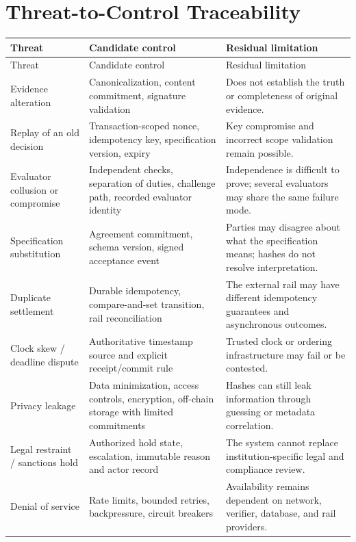 \documentclass[12pt,a4paper,oneside]{report}
\begin{document}
\section{Threat-to-Control Traceability}
\begin{longtable}{>{\raggedright\arraybackslash}p{}>{\raggedright\arraybackslash}p{}>{\raggedright\arraybackslash}p{}}
\toprule
Threat & Candidate control & Residual limitation \\
\midrule
\endfirsthead
\toprule Threat & Candidate control & Residual limitation \\
\endhead
Evidence alteration & Canonicalization, content commitment, signature validation & Does not establish the truth or completeness of original evidence. \\
Replay of an old decision & Transaction-scoped nonce, idempotency key, specification version, expiry & Key compromise and incorrect scope validation remain possible. \\
Evaluator collusion or compromise & Independent checks, separation of duties, challenge path, recorded evaluator identity & Independence is difficult to prove; several evaluators may share the same failure mode. \\
Specification substitution & Agreement commitment, schema version, signed acceptance event & Parties may disagree about what the specification means; hashes do not resolve interpretation. \\
Duplicate settlement & Durable idempotency, compare-and-set transition, rail reconciliation & The external rail may have different idempotency guarantees and asynchronous outcomes. \\
Clock skew / deadline dispute & Authoritative timestamp source and explicit receipt/commit rule & Trusted clock or ordering infrastructure may fail or be contested. \\
Privacy leakage & Data minimization, access controls, encryption, off-chain storage with limited commitments & Hashes can still leak information through guessing or metadata correlation. \\
Legal restraint / sanctions hold & Authorized hold state, escalation, immutable reason and actor record & The system cannot replace institution-specific legal and compliance review. \\
Denial of service & Rate limits, bounded retries, backpressure, circuit breakers & Availability remains dependent on network, verifier, database, and rail providers. \\
\bottomrule
\end{longtable}
\end{document}
